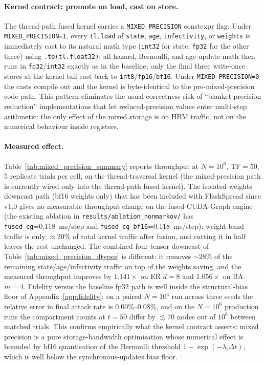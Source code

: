 \documentclass[a4paper,fleqn]{cas-sc}
\theoremstyle{definition}
\theoremstyle{remark}
\begin{document}
\paragraph{Kernel contract: promote on load, cast on store.}
The thread-path fused kernel carries a \texttt{MIXED\_PRECISION} constexpr flag. Under \texttt{MIXED\_PRECISION=1}, every \texttt{tl.load} of \texttt{state}, \texttt{age}, \texttt{infectivity}, or \texttt{weights} is immediately cast to its natural math type (\texttt{int32} for state, \texttt{fp32} for the other three) using \texttt{.to(tl.float32)}; all hazard, Bernoulli, and age-update math then runs in \texttt{fp32}/\texttt{int32} exactly as in the baseline; only the final three write-once stores at the kernel tail cast back to \texttt{int8}/\texttt{fp16}/\texttt{bf16}. Under \texttt{MIXED\_PRECISION=0} the casts compile out and the kernel is byte-identical to the pre-mixed-precision code path. This pattern eliminates the usual correctness risk of ``blanket precision reduction'' implementations that let reduced-precision values enter multi-step arithmetic: the only effect of the mixed storage is on HBM traffic, not on the numerical behaviour inside registers.

\paragraph{Measured effect.}
Table~\ref{tab:mixed_precision_summary} reports throughput at $N = 10^6$, $\mathrm{TF}=50$, 5 replicate trials per cell, on the thread-traversal kernel (the mixed-precision path is currently wired only into the thread-path fused kernel). The isolated-weights downcast path (bf16 weights only) that has been included with FlashSpread since v1.0 gives no measurable throughput change on the fused CUDA-Graph engine (the existing ablation in \texttt{results/ablation\_nonmarkov/} has \texttt{fused\_cg}=0.118~ms/step and \texttt{fused\_cg\_bf16}=0.118~ms/step): weight-band traffic is only $\approx 20\%$ of total kernel traffic after fusion, and cutting it in half leaves the rest unchanged. The combined four-tensor downcast of Table~\ref{tab:mixed_precision_dtypes} is different: it removes $\sim\!28\%$ of the remaining state/age/infectivity traffic on top of the weights saving, and the measured throughput improves by $1.141\times$ on ER $d{=}8$ and $1.056\times$ on BA $m{=}4$. Fidelity versus the baseline fp32 path is well inside the structural-bias floor of Appendix~\ref{app:fidelity}: on a paired $N=10^4$ run across three seeds the relative error in final attack rate is $0.00\%$--$0.08\%$, and on the $N=10^6$ production runs the compartment counts at $t=50$ differ by $\lesssim\!70$ nodes out of $10^6$ between matched trials. This confirms empirically what the kernel contract asserts: mixed precision is a pure storage-bandwidth optimisation whose numerical effect is bounded by bf16 quantisation of the Bernoulli threshold $1 - \exp(-\lambda_i \Delta t)$, which is well below the synchronous-updates bias floor.
\end{document}
